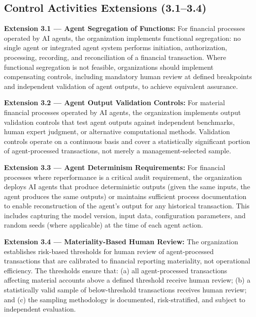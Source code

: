 \documentclass[12pt]{article}
\begin{document}
\subsection{Control Activities Extensions (3.1--3.4)}

\begin{definitionbox}
\textbf{Extension 3.1 --- Agent Segregation of Functions:} For financial processes operated by AI agents, the organization implements functional segregation: no single agent or integrated agent system performs initiation, authorization, processing, recording, and reconciliation of a financial transaction. Where functional segregation is not feasible, organizations should implement compensating controls, including mandatory human review at defined breakpoints and independent validation of agent outputs, to achieve equivalent assurance.
\end{definitionbox}

\begin{definitionbox}
\textbf{Extension 3.2 --- Agent Output Validation Controls:} For material financial processes operated by AI agents, the organization implements output validation controls that test agent outputs against independent benchmarks, human expert judgment, or alternative computational methods. Validation controls operate on a continuous basis and cover a statistically significant portion of agent-processed transactions, not merely a management-selected sample.
\end{definitionbox}

\begin{definitionbox}
\textbf{Extension 3.3 --- Agent Determinism Requirements:} For financial processes where reperformance is a critical audit requirement, the organization deploys AI agents that produce deterministic outputs (given the same inputs, the agent produces the same outputs) or maintains sufficient process documentation to enable reconstruction of the agent's output for any historical transaction. This includes capturing the model version, input data, configuration parameters, and random seeds (where applicable) at the time of each agent action.
\end{definitionbox}

\begin{definitionbox}
\textbf{Extension 3.4 --- Materiality-Based Human Review:} The organization establishes risk-based thresholds for human review of agent-processed transactions that are calibrated to financial reporting materiality, not operational efficiency. The thresholds ensure that: (a) all agent-processed transactions affecting material accounts above a defined threshold receive human review; (b) a statistically valid sample of below-threshold transactions receives human review; and (c) the sampling methodology is documented, risk-stratified, and subject to independent evaluation.
\end{definitionbox}
\end{document}
